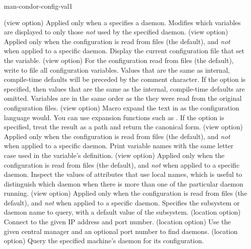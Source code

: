 \begin{ManPage}{}{man-condor-config-val}{1}
\begin{Options}
   {(view option)
    Applied only when a  specifies a daemon.
    Modifies which variables are displayed to only those \emph{not}
    used by the specified daemon.
   }
   {(view option)
    Applied only when the configuration is read from files (the default),
    and \emph{not} when applied to a specific daemon.
    Display the current configuration file that set the variable.
   }
   {(view option)
    For the configuration read from files (the default),
    write to file  all configuration variables. Values that are
    the same as internal, compile-time defaults will be preceded by the comment character.
    If the  option is specified, then values that are the same as
    the internal, compile-time defaults are omitted. Variables are in the same
    order as the they were read from the original configuration files.
   }
   {(view option)
    Macro expand the text in  as the configuration language would. You can use
    expansion functions such as .
    If the  option is specified, treat the result as a path and return
    the canonical form.
   }
   {(view option)
    Applied only when the configuration is read from files (the default),
    and \emph{not} when applied to a specific daemon.
    Print variable names with the same letter case used in the 
    variable's definition.
   }
   {(view option) 
    Applied only when the configuration is read from files (the default),
    and \emph{not} when applied to a specific daemon.
    Inspect the values of attributes that use local names,
    which is useful to distinguish which daemon when there is more than
    one of the particular daemon running.}
   {(view option) 
    Applied only when the configuration is read from files (the default),
    and \emph{not} when applied to a specific daemon.
    Specifies the subsystem or daemon name to query, 
    with a default value of the  subsystem.
   }
   {(location option)
    Connect to the given IP address and port number. }
    {(location option) Use the given central manager and an optional 
    port number to find daemons. }
   { (location option)
    Query the specified
    machine's  daemon for its configuration. 
}
\end{Options}
\end{ManPage}
